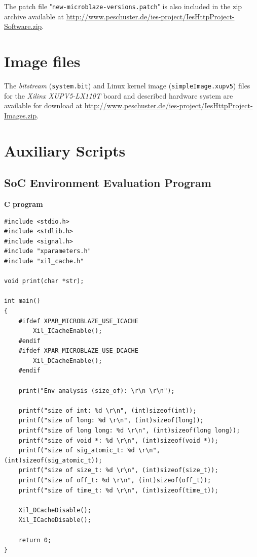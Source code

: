 The patch file "\texttt{new-microblaze-versions.patch}" is also included in the zip archive available at \url{http://www.peschuster.de/ies-project/IesHttpProject-Software.zip}.
\\

\section{Image files}

The \textit{bitstream} (\texttt{system.bit}) and Linux kernel image (\texttt{simpleImage.xupv5}) files for the \textit{Xilinx XUPV5-LX110T} board and described hardware system are available for download at \url{http://www.peschuster.de/ies-project/IesHttpProject-Images.zip}.


\section{Auxiliary Scripts}

\subsection{SoC Environment Evaluation Program}
\label{sec:nginx-env-eval}

\textbf{C program}
\begin{verbatim}
#include <stdio.h>
#include <stdlib.h>
#include <signal.h>
#include "xparameters.h"
#include "xil_cache.h"

void print(char *str);

int main()
{
    #ifdef XPAR_MICROBLAZE_USE_ICACHE
        Xil_ICacheEnable();
    #endif
    #ifdef XPAR_MICROBLAZE_USE_DCACHE
        Xil_DCacheEnable();
    #endif

    print("Env analysis (size_of): \r\n \r\n");

    printf("size of int: %d \r\n", (int)sizeof(int));
    printf("size of long: %d \r\n", (int)sizeof(long));
    printf("size of long long: %d \r\n", (int)sizeof(long long));
    printf("size of void *: %d \r\n", (int)sizeof(void *));
    printf("size of sig_atomic_t: %d \r\n", (int)sizeof(sig_atomic_t));
    printf("size of size_t: %d \r\n", (int)sizeof(size_t));
    printf("size of off_t: %d \r\n", (int)sizeof(off_t));
    printf("size of time_t: %d \r\n", (int)sizeof(time_t));

    Xil_DCacheDisable();
    Xil_ICacheDisable();

    return 0;
}
\end{verbatim}

